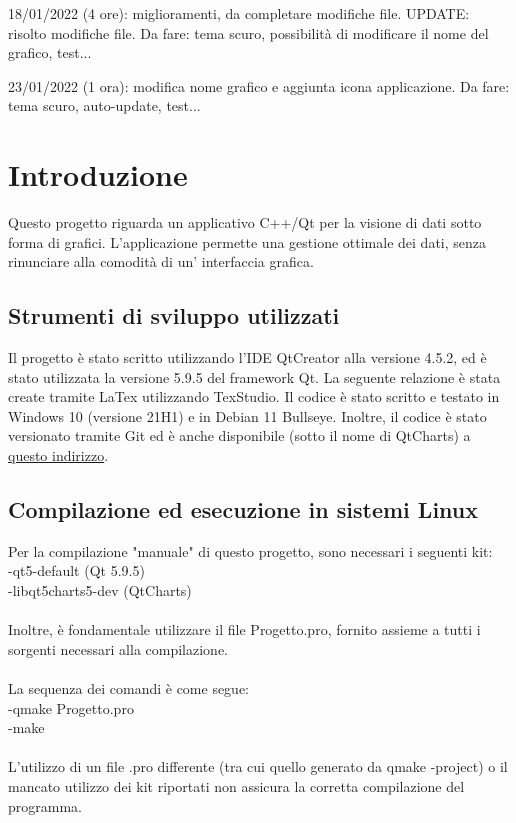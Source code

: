 \documentclass[10pt]{article}
\begin{document}
    18/01/2022 (4 ore): miglioramenti, da completare modifiche file. UPDATE: risolto modifiche file. Da fare: tema scuro, possibilità di modificare il nome del grafico, test...
    
    23/01/2022 (1 ora): modifica nome grafico e aggiunta icona applicazione. Da fare: tema scuro, auto-update, test...
    
    \newpage
    \tableofcontents
    \newpage
    \section{Introduzione}
     Questo progetto riguarda un applicativo C++/Qt per la visione di dati sotto forma di grafici. L'applicazione permette una gestione ottimale dei dati, senza rinunciare alla comodità di un' interfaccia grafica.
    \subsection{Strumenti di sviluppo utilizzati}
    Il progetto è stato scritto utilizzando l'IDE QtCreator alla versione 4.5.2, ed è stato utilizzata la versione 5.9.5 del framework Qt. 
    La seguente relazione è stata create tramite LaTex utilizzando TexStudio.
    Il codice è stato scritto e testato in Windows 10 (versione 21H1) e in Debian 11 Bullseye.
    Inoltre, il codice è stato versionato tramite Git ed è anche disponibile (sotto il nome di QtCharts) a \href{https://github.com/nicolabaesso/qtCharts}{questo indirizzo}.
    \subsection{Compilazione ed esecuzione in sistemi Linux}
    Per la compilazione "manuale" di questo progetto, sono necessari i seguenti kit:\\
    -qt5-default (Qt 5.9.5)\\
    -libqt5charts5-dev (QtCharts)
    \\
    \\
    Inoltre, è fondamentale utilizzare il file Progetto.pro, fornito assieme a tutti i sorgenti necessari alla compilazione.\\
    \\
    La sequenza dei comandi è come segue:\\
    -qmake Progetto.pro\\
    -make
    \\\\
    L'utilizzo di un file .pro differente (tra cui quello generato da qmake -project) o il mancato utilizzo dei kit riportati non assicura la corretta compilazione del programma.
\end{document}
